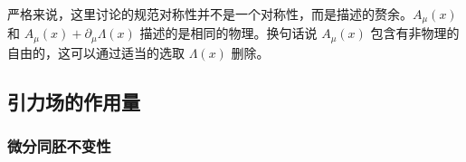 严格来说，这里讨论的规范对称性并不是一个对称性，而是描述的赘余。$A_\mu(x)$ 和 $A_\mu(x)+\partial_\mu\Lambda(x)$ 描述的是相同的物理。换句话说 $A_\mu(x)$ 包含有非物理的自由的，这可以通过适当的选取 $\Lambda(x)$ 删除。









\subsection{引力场的作用量}


\subsubsection{微分同胚不变性}

























